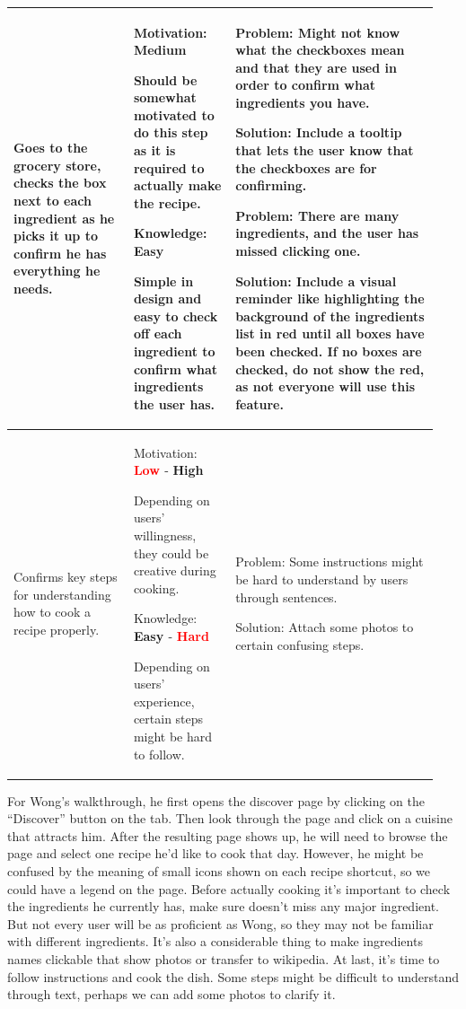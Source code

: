 \documentclass[11pt,english]{article}
\begin{document}
\begin{longtable}{!{\color{black}\vrule}>{\hspace{0pt}}m{0.267\linewidth}!{\color{black}\vrule}>{\hspace{0pt}}m{0.227\linewidth}!{\color{black}\vrule}>{\hspace{0pt}}m{0.444\linewidth}!{\color{black}\vrule}}
Goes to the grocery store, checks the box next to each ingredient as he picks it up to confirm he has everything he needs. & Motivation: \textcolor[rgb]{1,0.647,0}{\textbf{Medium}}\par{}Should be somewhat motivated to do this step as it is required to actually make the recipe.\par{}Knowledge: \textbf{\textcolor[rgb]{0,0.502,0}{Easy}}\par{}Simple in design and easy to check off each ingredient to confirm what ingredients the user has. & Problem: Might not know what the checkboxes mean and that they are used in order to confirm what ingredients you have.\par{}Solution: Include a tooltip that lets the user know that the checkboxes are for confirming.\par{}Problem: There are many ingredients, and the user has missed clicking one.\par{}Solution: Include a visual reminder like highlighting the background of the ingredients list in red until all boxes have been checked. If no boxes are checked, do not show the red, as not everyone will use this feature. \\ \hline
Confirms key steps for understanding how to cook a recipe properly.~ & Motivation: \textbf{\textcolor{red}{Low }}- \textbf{\textcolor[rgb]{0,0.502,0}{High}}\par{}Depending on users’ willingness, they could be creative during cooking.\par{}Knowledge: \textbf{\textcolor[rgb]{0,0.502,0}{Easy }}- \textbf{\textcolor{red}{Hard}}\par{}Depending on users’ experience, certain steps might be hard to follow. & Problem: Some instructions might be hard to understand by users through sentences.\par{}Solution: Attach some photos to certain confusing steps. \\ \hline
\end{longtable}
For Wong’s walkthrough, he first opens the discover page by clicking on the “Discover” button on the tab. Then look through the page and click on a cuisine that attracts him. After the resulting page shows up, he will need to browse the page and select one recipe he’d like to cook that day. However, he might be confused by the meaning of small icons shown on each recipe shortcut, so we could have a legend on the page. Before actually cooking it’s important to check the ingredients he currently has, make sure doesn’t miss any major ingredient. But not every user will be as proficient as Wong, so they may not be familiar with different ingredients. It’s also a considerable thing to make ingredients names clickable that show photos or transfer to wikipedia. At last, it’s time to follow instructions and cook the dish. Some steps might be difficult to understand through text, perhaps we can add some photos to clarify it.
\end{document}
